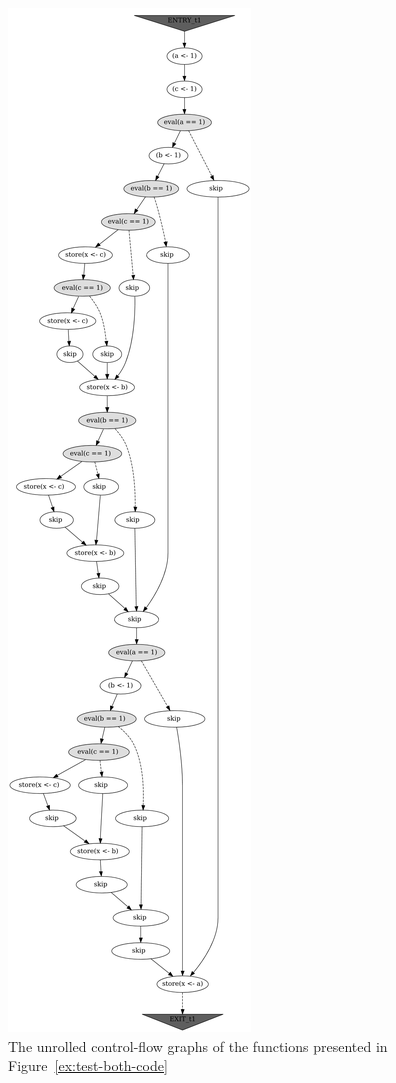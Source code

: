 \begin{figure}[!h]
\begin{minipage}{.39\textwidth}
  \includegraphics[height=\textheight,width=\textwidth]{img/my/graphs/unrolling-comparison/Porthos/t0_unrolled.png}
\end{minipage}
%
\caption{The unrolled control-flow graphs of the functions presented in Figure~\ref{ex:test-both-code}}
\label{ex:test-both-pic-unroll}
\end{figure}

